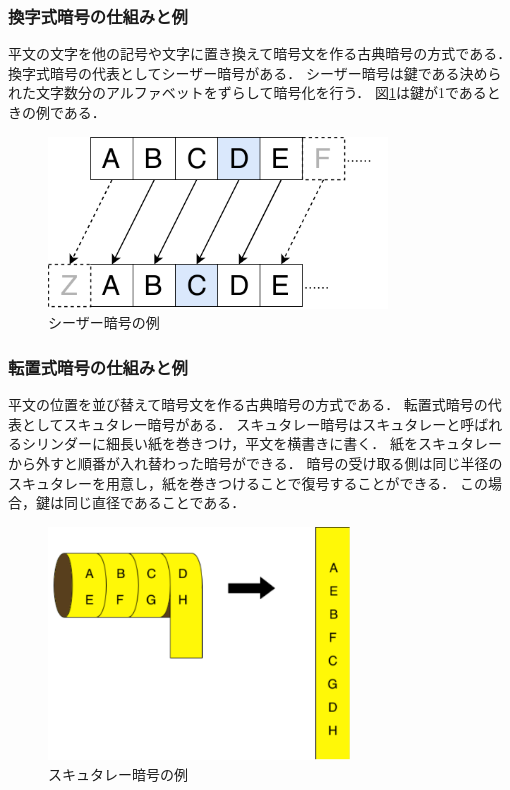 \documentclass[a4j,12pt]{jsarticle}
\begin{document}
\newpage
\subsubsection{換字式暗号の仕組みと例}
平文の文字を他の記号や文字に置き換えて暗号文を作る古典暗号の方式である．
換字式暗号の代表としてシーザー暗号がある．
シーザー暗号は鍵である決められた文字数分のアルファベットをずらして暗号化を行う．
図\ref{fig:05}は鍵が1であるときの例である．\\

\begin{figure}[H]
\centering
\includegraphics[width=9cm]{05.pdf}
\caption{シーザー暗号の例}
\label{fig:05}
\end{figure} 


\subsubsection{転置式暗号の仕組みと例}
平文の位置を並び替えて暗号文を作る古典暗号の方式である．
転置式暗号の代表としてスキュタレー暗号がある．
スキュタレー暗号はスキュタレーと呼ばれるシリンダーに細長い紙を巻きつけ，平文を横書きに書く．
紙をスキュタレーから外すと順番が入れ替わった暗号ができる．
暗号の受け取る側は同じ半径のスキュタレーを用意し，紙を巻きつけることで復号することができる．
この場合，鍵は同じ直径であることである．\\

\begin{figure}[H]
\centering
\includegraphics[width=8cm]{062.pdf}
\caption{スキュタレー暗号の例}
\label{fig:06}
\end{figure} 
\end{document}
